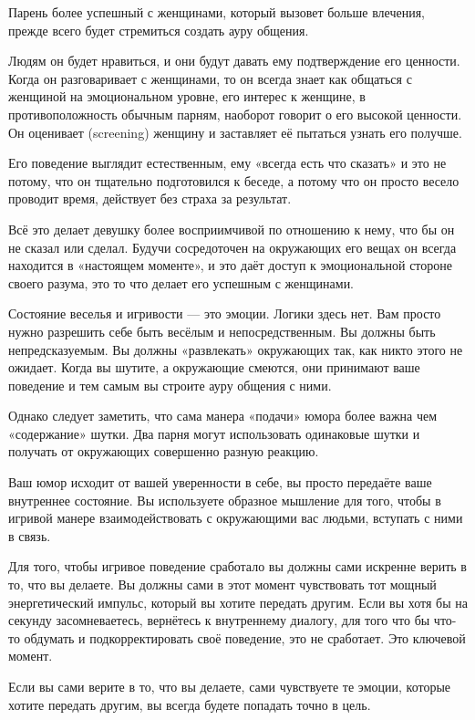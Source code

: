 Парень более успешный с женщинами, который вызовет больше влечения, прежде всего будет стремиться создать ауру общения.

Людям он будет нравиться, и они будут давать ему подтверждение его ценности. Когда он разговаривает с женщинами, то он всегда знает как общаться с женщиной на эмоциональном уровне, его интерес к женщине, в противоположность обычным парням, наоборот говорит о его высокой ценности. Он оценивает (screening) женщину и заставляет её пытаться узнать его получше.

Его поведение выглядит естественным, ему «всегда есть что сказать» и это не потому, что он тщательно подготовился к беседе, а потому что он просто весело проводит время, действует без страха за результат.

Всё это делает девушку более восприимчивой по отношению к нему, что бы он не сказал или сделал. Будучи сосредоточен на окружающих его вещах он всегда находится в «настоящем моменте», и это даёт доступ к эмоциональной стороне своего разума, это то что делает его успешным с женщинами.

Состояние веселья и игривости --- это эмоции. Логики здесь нет. Вам просто нужно разрешить себе быть весёлым и непосредственным. Вы должны быть непредсказуемым. Вы должны «развлекать» окружающих так, как никто этого не ожидает. Когда вы шутите, а окружающие смеются, они принимают ваше поведение и тем самым вы строите ауру общения с ними.

Однако следует заметить, что сама манера «подачи» юмора более важна чем «содержание» шутки. Два парня могут использовать одинаковые шутки и получать от окружающих совершенно разную реакцию.

Ваш юмор исходит от вашей уверенности в себе, вы просто передаёте ваше внутреннее состояние. Вы используете образное мышление для того, чтобы в игривой манере взаимодействовать с окружающими вас людьми, вступать с ними в связь.

Для того, чтобы игривое поведение сработало вы должны сами искренне верить в то, что вы делаете. Вы должны сами в этот момент чувствовать тот мощный энергетический импульс, который вы хотите передать другим. Если вы хотя бы на секунду засомневаетесь, вернётесь к внутреннему диалогу, для того что бы что-то обдумать и подкорректировать своё поведение, это не сработает. Это ключевой момент.

Если вы сами верите в то, что вы делаете, сами чувствуете те эмоции, которые хотите передать другим, вы всегда будете попадать точно в цель.

